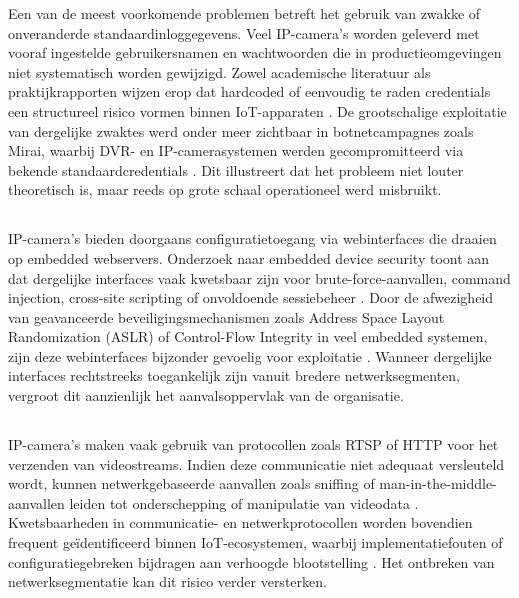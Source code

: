 Een van de meest voorkomende problemen betreft het gebruik van zwakke of onveranderde standaardinloggegevens. Veel IP-camera’s worden geleverd met vooraf ingestelde gebruikersnamen en wachtwoorden die in productieomgevingen niet systematisch worden gewijzigd. Zowel academische literatuur als praktijkrapporten wijzen erop dat hardcoded of eenvoudig te raden credentials een structureel risico vormen binnen IoT-apparaten \autocite{baho2023analysis,Butun2019arXivIoTSecurity}. De grootschalige exploitatie van dergelijke zwaktes werd onder meer zichtbaar in botnetcampagnes zoals Mirai, waarbij DVR- en IP-camerasystemen werden gecompromitteerd via bekende standaardcredentials \autocite{zhou2023survey}. Dit illustreert dat het probleem niet louter theoretisch is, maar reeds op grote schaal operationeel werd misbruikt.

\subsection{}%
\label{subsec:web-interfaces}

IP-camera’s bieden doorgaans configuratietoegang via webinterfaces die draaien op embedded webservers. Onderzoek naar embedded device security toont aan dat dergelijke interfaces vaak kwetsbaar zijn voor brute-force-aanvallen, command injection, cross-site scripting of onvoldoende sessiebeheer \autocite{zhou2023survey}. Door de afwezigheid van geavanceerde beveiligingsmechanismen zoals Address Space Layout Randomization (ASLR) of Control-Flow Integrity in veel embedded systemen, zijn deze webinterfaces bijzonder gevoelig voor exploitatie \autocite{zhou2023survey}. Wanneer dergelijke interfaces rechtstreeks toegankelijk zijn vanuit bredere netwerksegmenten, vergroot dit aanzienlijk het aanvalsoppervlak van de organisatie.

\subsection{}%
\label{subsec:protocol-risks}

IP-camera’s maken vaak gebruik van protocollen zoals RTSP of HTTP voor het verzenden van videostreams. Indien deze communicatie niet adequaat versleuteld wordt, kunnen netwerkgebaseerde aanvallen zoals sniffing of man-in-the-middle-aanvallen leiden tot onderschepping of manipulatie van videodata \autocite{ENISA2024ThreatLandscape}. Kwetsbaarheden in communicatie- en netwerkprotocollen worden bovendien frequent geïdentificeerd binnen IoT-ecosystemen, waarbij implementatiefouten of configuratiegebreken bijdragen aan verhoogde blootstelling \autocite{baho2023analysis}. Het ontbreken van netwerksegmentatie kan dit risico verder versterken.

